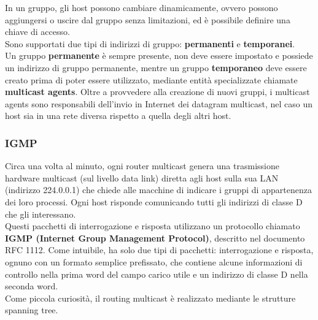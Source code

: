         In un gruppo, gli host possono cambiare dinamicamente, ovvero possono aggiungersi o uscire
        dal gruppo senza limitazioni, ed è possibile definire una chiave di accesso.\\

        Sono supportati due tipi di indirizzi di gruppo: \textbf{permanenti} e \textbf{temporanei}.\\
        
        Un gruppo \textbf{permanente} è sempre presente, non deve essere impostato e possiede un indirizzo
        di gruppo permanente, mentre un gruppo \textbf{temporaneo} deve essere creato prima di poter
        essere utilizzato, mediante entità specializzate chiamate \textbf{multicast agents}. Oltre a provvedere
        alla creazione di nuovi gruppi, i multicast agents sono responsabili dell’invio in Internet dei
        datagram multicast, nel caso un host sia in una rete diversa rispetto a quella degli altri host.

            \subsubsection*{IGMP}
            Circa una volta al minuto, ogni router multicast genera una trasmissione hardware multicast
            (sul livello data link) diretta agli host sulla sua LAN (indirizzo 224.0.0.1) che chiede alle
            macchine di indicare i gruppi di appartenenza dei loro processi. Ogni host risponde
            comunicando tutti gli indirizzi di classe D che gli interessano.\\
            
            Questi pacchetti di interrogazione e risposta utilizzano un protocollo chiamato \textbf{IGMP (Internet
            Group Management Protocol)}, descritto nel documento RFC 1112. Come intuibile, ha solo due
            tipi di pacchetti: interrogazione e risposta, ognuno con un formato semplice prefissato, che
            contiene alcune informazioni di controllo nella prima word del campo carico utile e un indirizzo
            di classe D nella seconda word.\\
            
            Come piccola curiosità, il routing multicast è realizzato mediante le strutture spanning tree.
            